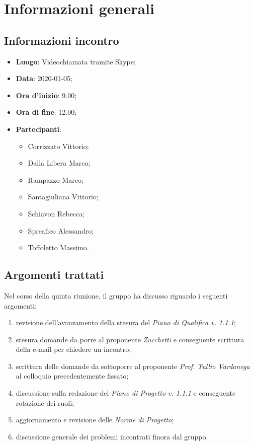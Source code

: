 \section{Informazioni generali}
    \subsection{Informazioni incontro}
        \begin{itemize}
            \item \textbf{Luogo}: Videochiamata tramite Skype;
            \item \textbf{Data}: 2020-01-05;
            \item \textbf{Ora d'inizio}: 9.00;
            \item \textbf{Ora di fine}: 12.00;
            \item \textbf{Partecipanti}: \begin{itemize}
                \item Corrizzato Vittorio;
                \item Dalla Libera Marco;
                \item Rampazzo Marco;
                \item Santagiuliana Vittorio;
                \item Schiavon Rebecca;
                \item Spreafico Alessandro;
                \item Toffoletto Massimo.
            \end{itemize}
        \end{itemize}
    \subsection{Argomenti trattati}
        Nel corso della quinta riunione, il gruppo ha discusso riguardo i seguenti argomenti:
        \begin{enumerate}
            \item revisione dell'avanzamento della stesura del \textit{Piano di Qualifica v. 1.1.1}; 
            \item stesura domande da porre al proponente \textit{Zucchetti} e conseguente scrittura della e-mail per chiedere un incontro;
            \item scrittura delle domande da sottoporre al proponente \textit{Prof. Tullio Vardanega} al colloquio precedentemente fissato;
            \item discussione sulla redazione del \textit{Piano di Progetto v. 1.1.1} e conseguente rotazione dei ruoli;
            \item aggiornamento e revisione delle \textit{Norme di Progetto};
            \item discussione generale dei problemi incontrati finora dal gruppo.
        \end{enumerate}

